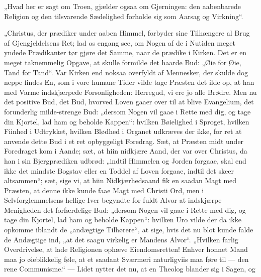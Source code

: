 \documentclass[12pt,a4paper]{book}
\begin{document}
„Hvad her er sagt om Troen, gjælder ogsaa om Gjerningen: den aabenbarede Religion og
den tilsvarende Sædelighed forholde sig som Aarsag og Virkning“.

„Christus, der prædiker under aaben Himmel, forbyder sine Tilhængere al Brug af
Gjengjeldelsens Ret; lad os engang see, om Nogen af de i Nutiden meget yndede
Prædikanter tør gjøre det Samme, naar de prædike i Kirken. Det er en meget taknemmelig
Opgave, at skulle formilde det haarde Bud: „Øie for Øie, Tand for Tand“. Var Kirken end
noksaa overfyldt af Mennesker, der skulde dog neppe findes En, som i vore humane Tider
vilde tage Præsten det ilde op, at han med Varme indskjærpede Forsonligheden: Herregud,
vi ere jo alle Brødre. Men nu det positive Bud, det Bud, hvorved Loven gaaer over til
at blive Evangelium, det forunderlig milde-strenge Bud: „dersom Nogen vil gaae i Rette
med dig, og tage din Kjortel, lad ham og beholde Kappen“: hvilken Bøielighed i Sproget,
hvilken Fiinhed i Udtrykket, hvilken Blødhed i Organet udkræves der ikke, for ret at
anvende dette Bud i et ret opbyggeligt Foredrag. Sæt, at Præsten midt under Foredraget
kom i Aande; sæt, at hiin nidkjære Aand, der var over Christus, da han i sin
Bjergprædiken udbrød: „indtil Himmelen og Jorden forgaae, skal end ikke det mindste
Bogstav eller en Toddel af Loven forgaae, indtil det skeer altsammen“; sæt, sige vi, at
hiin Nidkjærhedsaand fik en saadan Magt med Præsten, at denne ikke kunde faae Magt med
Christi Ord, men i Selvforglemmelsens hellige Iver begyndte for fuldt Alvor at
indskjærpe Menigheden det forfærdelige Bud: „dersom Nogen vil gaae i Rette med dig, og
tage din Kjortel, lad ham og beholde Kappen“: hvilken Uro vilde der da ikke opkomme
iblandt de „andægtige Tilhørere“, at
sige, hvis det nu blot kunde falde de Andægtige ind, „at det saagu virkelig er Mandens
Alvor“. „Hvilken farlig Overdrivelse, at lade Religionen ophæve Eiendomsretten! Enhver
honnet Mand maa jo øieblikkelig føle, at et saadant Sværmeri naturligviis maa føre til ---
den rene Communisme.“ --- Lidet nytter det nu, at en Theolog blander sig i Sagen, og
\end{document}
